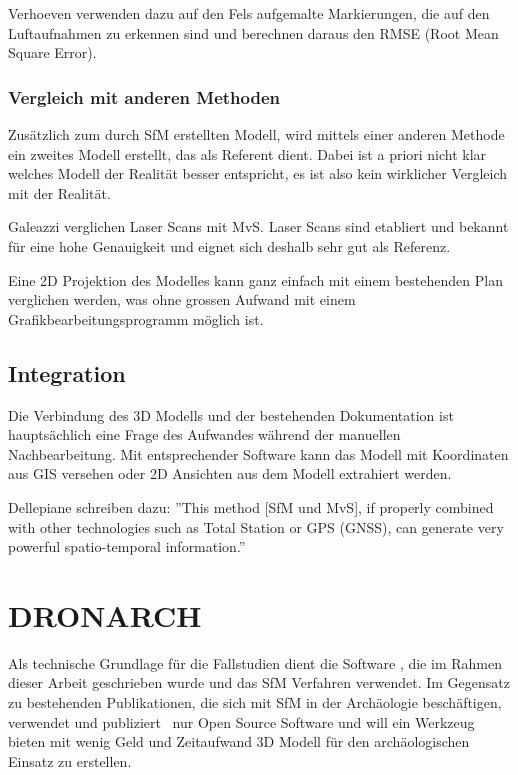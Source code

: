 				Verhoeven \etal{} verwenden dazu auf den Fels aufgemalte Markierungen, die auf den Luftaufnahmen zu erkennen sind und berechnen daraus den RMSE (Root Mean Square Error).

			\subsubsection{Vergleich mit anderen Methoden}
				Zusätzlich zum durch SfM erstellten Modell, wird mittels einer anderen Methode ein zweites Modell erstellt, das als Referent dient. Dabei ist a priori nicht klar welches Modell der Realität besser entspricht, es ist also kein wirklicher Vergleich mit der Realität.
				
				Galeazzi \etal{} verglichen Laser Scans mit MvS. Laser Scans sind etabliert und bekannt für eine hohe Genauigkeit und eignet sich deshalb sehr gut als Referenz.
				
				Eine 2D Projektion des Modelles kann ganz einfach mit einem bestehenden Plan verglichen werden, was ohne grossen Aufwand mit einem Grafikbearbeitungsprogramm möglich ist.
			
		\subsection{Integration}
			Die Verbindung des 3D Modells und der bestehenden Dokumentation ist hauptsächlich eine Frage des Aufwandes während der manuellen Nachbearbeitung. Mit entsprechender Software kann das Modell mit Koordinaten aus GIS versehen oder 2D Ansichten aus dem Modell extrahiert werden.
			
			Dellepiane \etal schreiben dazu: ''This method [SfM und MvS], if properly combined with other technologies such as Total Station or GPS (GNSS), can generate very powerful spatio-temporal information.''
		
	\section{DRONARCH}
		Als technische Grundlage für die Fallstudien dient die Software \dronarch{}, die im Rahmen dieser Arbeit geschrieben wurde und das SfM Verfahren verwendet.
		Im Gegensatz zu bestehenden Publikationen, die sich mit SfM in der Archäologie beschäftigen, verwendet und publiziert \dronarch\ nur Open Source Software und will ein Werkzeug bieten mit wenig Geld und Zeitaufwand 3D Modell für den archäologischen Einsatz zu erstellen.

	